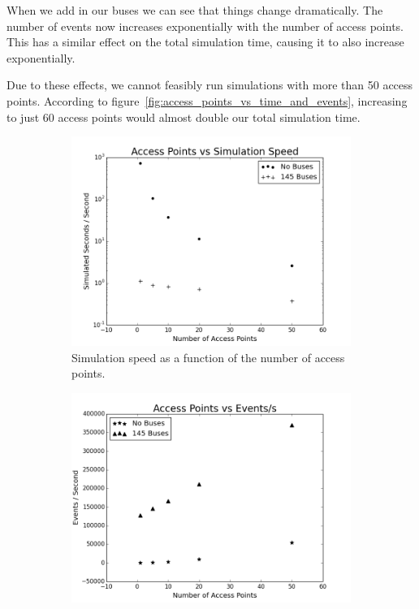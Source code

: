         When we add in our buses we can see that things change dramatically. The number of events now increases exponentially with the number of access points. This has a similar effect on the total simulation time, causing it to also increase exponentially. 

        Due to these effects, we cannot feasibly run simulations with more than 50 access points. According to figure~\ref{fig:access_points_vs_time_and_events}, increasing to just 60 access points would almost double our total simulation time. 

        \begin{figure}
            \centering
            \begin{subfigure}{0.45\textwidth}
                \centering
                \includegraphics[width=\linewidth]{./images/AP_vs_Simulation_Speed.png}
                \caption{Simulation speed as a function of the number of access points.}
                \label{fig:access_points_speed}
            \end{subfigure}%
            \begin{subfigure}{0.45\textwidth}
                \includegraphics[width=\linewidth]{./images/AP_vs_Events.png}

\end{subfigure}
\end{figure}
